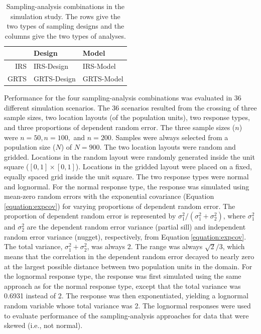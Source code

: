 \documentclass[]{elsarticle} %
\begin{document}
\begin{table}[ht]
\centering
\begin{tabular}{r|ll}
  \hline
 & Design & Model \\ 
  \hline
IRS & IRS-Design & IRS-Model \\ 
  GRTS & GRTS-Design & GRTS-Model \\ 
   \hline
\end{tabular}
\caption{\label{tab:designanalysis} Sampling-analysis combinations in the simulation study. The rows give the two types of sampling designs and the columns give the two types of analyses.} 
\end{table}

Performance for the four sampling-analysis combinations was evaluated in
36 different simulation scenarios. The 36 scenarios resulted from the
crossing of three sample sizes, two location layouts (of the population
units), two response types, and three proportions of dependent random
error. The three sample sizes (\(n\)) were \(n = 50, n = 100,\) and
\(n = 200\). Samples were always selected from a population size (\(N\))
of \(N = 900\). The two location layouts were random and gridded.
Locations in the random layout were randomly generated inside the unit
square (\([0, 1] \times [0, 1]\)). Locations in the gridded layout were
placed on a fixed, equally spaced grid inside the unit square. The two
response types were normal and lognormal. For the normal response type,
the response was simulated using mean-zero random errors with the
exponential covariance (Equation\(~\)\ref{equation:expcov}) for varying
proportions of dependent random error. The proportion of dependent
random error is represented by
\(\sigma^2_1 / (\sigma^2_1 + \sigma^2_2)\), where \(\sigma^2_1\) and
\(\sigma^2_2\) are the dependent random error variance (partial sill)
and independent random error variance (nugget), respectively, from
Equation\(~\)\ref{equation:expcov}. The total variance,
\(\sigma^2_1 + \sigma^2_2\), was always 2. The range was always
\(\sqrt{2} / 3\), which means that the correlation in the dependent
random error decayed to nearly zero at the largest possible distance
between two population units in the domain. For the lognormal response
type, the response was first simulated using the same approach as for
the normal response type, except that the total variance was 0.6931
instead of 2. The response was then exponentiated, yielding a lognormal
random variable whose total variance was 2. The lognormal responses were
used to evaluate performance of the sampling-analysis approaches for
data that were skewed (i.e., not normal).
\end{document}
